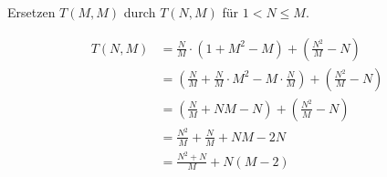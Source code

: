 \documentclass[parskip=half,a4paper]{scrartcl}
\begin{document}
\begin{center}
Ersetzen $T(M,M)$ durch $T(N,M)$ für $1 < N \le M$.
\end{center}

\begin{equation*}
\begin{aligned}
    T(N, M) & =  \frac{N}{M} \cdot (1 + M^2 - M) + (\frac{N^2}{M} - N) \\
    & =  (\frac{N}{M} + \frac{N}{M} \cdot M^2 - M \cdot \frac{N}{M}) + (\frac{N^2}{M} - N) \\
    & =  (\frac{N}{M} + NM - N) + (\frac{N^2}{M} - N) \\
    & =  \frac{N^2}{M} + \frac{N}{M} + NM - 2N \\
    & =  \frac{N^2 + N}{M} + N (M-2) \\
\end{aligned}
\end{equation*}
\end{document}
